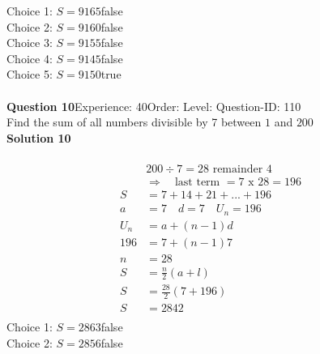 \documentclass{article}
\begin{document}
Choice 1: \hspace{20pt}$S=9165$\hspace{20pt}false\\
Choice 2: \hspace{20pt}$S=9160$\hspace{20pt}false\\
Choice 3: \hspace{20pt}$S=9155$\hspace{20pt}false\\
Choice 4: \hspace{20pt}$S=9145$\hspace{20pt}false\\
Choice 5: \hspace{20pt}$S=9150$\hspace{20pt}true\\
\\[4pt]
\noindent\textbf{Question 10}\hspace{20pt}Experience: 40\hspace{20pt}Order: \hspace{20pt}Level: \hspace{20pt}Question-ID: 110\\[2pt]
Find the sum of all numbers divisible by 7 between $1$ and $200$\\[4pt]
\noindent\textbf{Solution 10}\\[2pt]
\\[-35pt]\begin{align*}
&200 \div 7 = 28 \,\, \text{remainder}\,\, 4\\[2pt]
&\Rightarrow \quad \text{last term }= 7 \,\,\text{x}\,\, 28=196\\[2pt]
S&=7+14+21+...+196\\[12pt]
a&=7\quad d=7 \quad U_n=196\\[2pt]
U_n&=a+(n-1)d\\[2pt]
196&=7+(n-1)7\\[2pt]
n&=28\\[12pt]
S&=\displaystyle\frac{n}{2}(a+l)\\[2pt]
S&=\displaystyle\frac{28}{2}(7+196)\\[2pt]
S&=2842\\[-140pt]
\end{align*}
Choice 1: \hspace{20pt}$S=2863$\hspace{20pt}false\\
Choice 2: \hspace{20pt}$S=2856$\hspace{20pt}false\\
\end{document}

